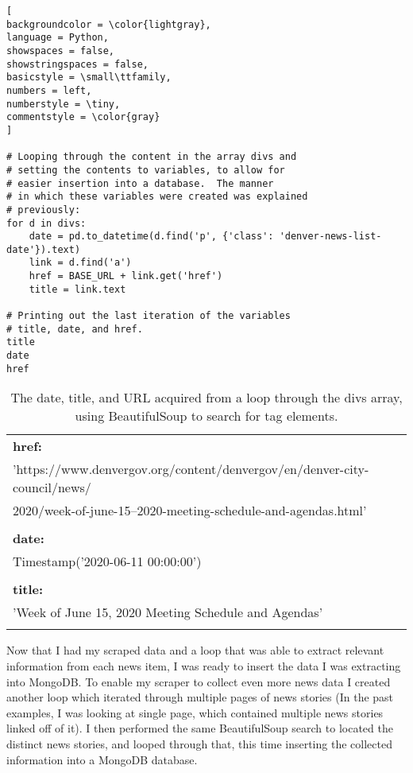 \documentclass[]{article}
\begin{document}
\begin{lstlisting}[
backgroundcolor = \color{lightgray},
language = Python,
showspaces = false,
showstringspaces = false,
basicstyle = \small\ttfamily,
numbers = left,
numberstyle = \tiny,
commentstyle = \color{gray}
]

# Looping through the content in the array divs and
# setting the contents to variables, to allow for 
# easier insertion into a database.  The manner
# in which these variables were created was explained
# previously:
for d in divs:
	date = pd.to_datetime(d.find('p', {'class': 'denver-news-list-date'}).text)
	link = d.find('a')
	href = BASE_URL + link.get('href')
	title = link.text

# Printing out the last iteration of the variables
# title, date, and href.
title
date
href
\end{lstlisting}
\pagebreak
\begin{table}[!ht]
	\begin{center}
		\caption{The date, title, and URL acquired from a loop through the divs array, using BeautifulSoup to search for tag elements.}
		\label{tab:table1}
		\begin{tabular}{|l|} 

			\hline
			\textbf{href:}\\
			'https://www.denvergov.org/content/denvergov/en/denver-city-council/news/\\
			2020/week-of-june-15--2020-meeting-schedule-and-agendas.html'\\
			\\
			\hline
			\textbf{date:}\\
			Timestamp('2020-06-11 00:00:00')\\
			\\
			\hline
			\textbf{title:}\\
			'Week of June 15, 2020 Meeting Schedule and Agendas'\\
			\\
			
			\hline
		\end{tabular}
	\end{center}
\end{table}
Now that I had my scraped data and a loop that was able to extract relevant information from each news item, I was ready to insert the data I was extracting into MongoDB.  To enable my scraper to collect even more news data I created another loop which iterated through multiple pages of news stories (In the past examples, I was looking at single page, which contained multiple news stories linked off of it).  I then performed the same BeautifulSoup search to located the distinct news stories, and looped through that, this time inserting the collected information into a MongoDB database.
\end{document}
